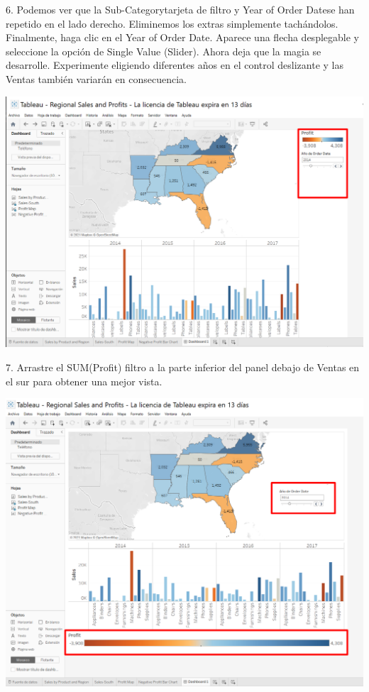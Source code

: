 \documentclass[12pt,letterpaper]{article}
\begin{document}
6. Podemos ver que la Sub-Categorytarjeta de filtro y Year of Order Datese han repetido
en el lado derecho. Eliminemos los extras simplemente tachándolos. Finalmente, haga clic en
el Year of Order Date. Aparece una flecha desplegable y seleccione la opción de Single 
Value (Slider). Ahora deja que la magia se desarrolle. Experimente eligiendo diferentes
años en el control deslizante y las Ventas también variarán en consecuencia.
\begin{center}
    \includegraphics[width=16cm]{img/51.png}  
\end{center}
7. Arrastre el SUM(Profit) filtro a la parte inferior del panel debajo de Ventas en el sur para
obtener una mejor vista.
\begin{center}
    \includegraphics[width=16cm]{img/52.png}  
\end{center}
\end{document}
